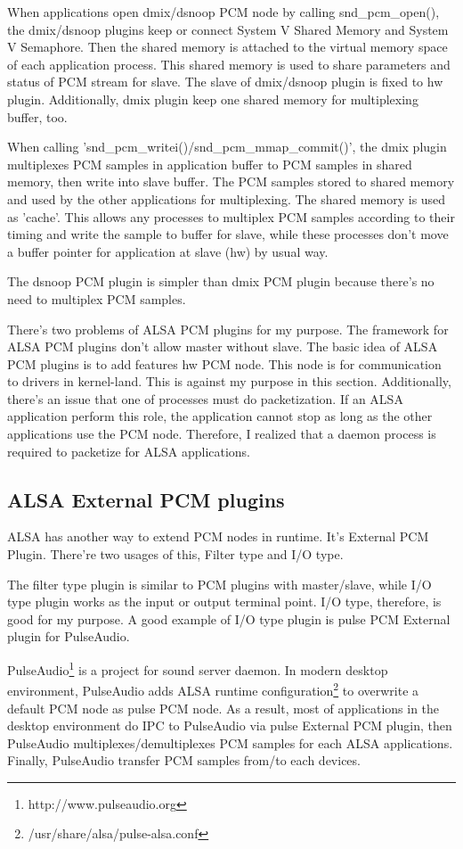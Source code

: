 \documentclass[onecolumn]{article}
\begin{document}
When applications open dmix/dsnoop PCM node by calling snd\_pcm\_open(), the dmix/dsnoop plugins keep or connect System V Shared Memory and System V Semaphore. Then the shared memory is attached to the virtual memory space of each application process. This shared memory is used to share parameters and status of PCM stream for slave. The slave of dmix/dsnoop plugin is fixed to hw plugin. Additionally, dmix plugin keep one shared memory for multiplexing buffer, too.

When calling 'snd\_pcm\_writei()/snd\_pcm\_mmap\_commit()', the dmix plugin multiplexes PCM samples in application buffer to PCM samples in shared memory, then write into slave buffer. The PCM samples stored to shared memory and used by the other applications for multiplexing. The shared memory is used as 'cache'. This allows any processes to multiplex PCM samples according to their timing and write the sample to buffer for slave, while these processes don't move a buffer pointer for application at slave (hw) by usual way.

The dsnoop PCM plugin is simpler than dmix PCM plugin because there's no need to multiplex PCM samples.

There's two problems of ALSA PCM plugins for my purpose. The framework for ALSA PCM plugins don't allow master without slave. The basic idea of ALSA PCM plugins is to add features hw PCM node. This node is for communication to drivers in kernel-land. This is against my purpose in this section. Additionally, there's an issue that one of processes must do packetization. If an ALSA application perform this role, the application cannot stop as long as the other applications use the PCM node. Therefore, I realized that a daemon process is required to packetize for ALSA applications.


\subsection{ALSA External PCM plugins}
ALSA has another way to extend PCM nodes in runtime. It's External PCM Plugin. There're two usages of this, Filter type and I/O type.

The filter type plugin is similar to PCM plugins with master/slave, while I/O type plugin works as the input or output terminal point. I/O type, therefore, is good for my purpose. A good example of I/O type plugin is pulse PCM External plugin for PulseAudio.

PulseAudio\footnote{http://www.pulseaudio.org} is a project for sound server daemon. In modern desktop environment, PulseAudio adds ALSA runtime configuration\footnote{/usr/share/alsa/pulse-alsa.conf} to overwrite a default PCM node as pulse PCM node. As a result, most of applications in the desktop environment do IPC to PulseAudio via pulse External PCM plugin, then PulseAudio multiplexes/demultiplexes PCM samples for each ALSA applications. Finally, PulseAudio transfer PCM samples from/to each devices.
\end{document}

